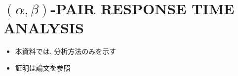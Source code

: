 
\section{$(\alpha, \beta)$-PAIR RESPONSE TIME ANALYSIS}
\label{sec: RESPONSE TIME ANALYSIS}

\begin{frame}{}
    \begin{itemize}
        \item 本資料では, 分析方法のみを示す
        \item 証明は論文を参照
    \end{itemize}
\end{frame}





